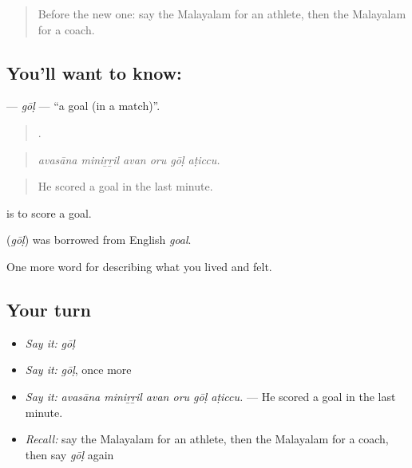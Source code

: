 \label{lesson:ML-C568-gol}



\begin{quote}
Before the new one: say the Malayalam for an athlete, then the Malayalam for a coach.
\end{quote}

\subsection*{You'll want to know: }
\textbf{} — \emph{gōḷ} — \textquotedblleft{}a goal (in a match)\textquotedblright{}.

\begin{quote}
     .
\end{quote}

\begin{quote}
\emph{avasāna miniṟṟil avan oru gōḷ aṭiccu.}
\end{quote}

\begin{quote}
He scored a goal in the last minute.
\end{quote}

  is to score a goal.

\begin{cousinweb}
\textbf{} (\emph{gōḷ}) was borrowed from English \emph{goal}.
\end{cousinweb}

\begin{grammarlens}[title={What you've built}]
One more word for describing what you lived and felt.
\end{grammarlens}

\subsection*{Your turn}
\begin{itemize}
\raggedright
  \item \emph{Say it:} \emph{gōḷ}
  \item \emph{Say it:} \emph{gōḷ}, once more
  \item \emph{Say it:} \emph{avasāna miniṟṟil avan oru gōḷ aṭiccu.} — He scored a goal in the last minute.
  \item \emph{Recall:} say the Malayalam for an athlete, then the Malayalam for a coach, then say \emph{gōḷ} again
\end{itemize}

